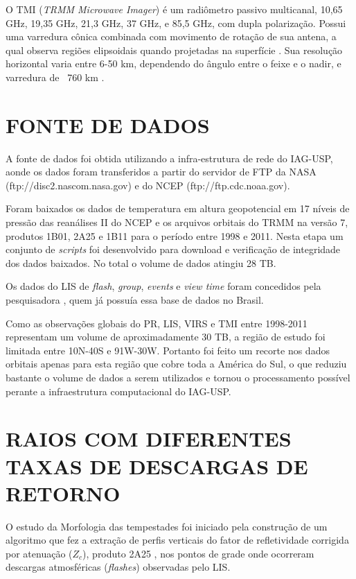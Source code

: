 O TMI (\textit{TRMM Microwave Imager}) é um radiômetro passivo multicanal, 10,65 GHz, 19,35 GHz, 21,3 GHz, 37 GHz, e 85,5 GHz, com dupla polarização. Possui uma varredura cônica combinada com movimento de rotação de sua antena, a qual observa regiões elipsoidais quando projetadas na superfície \cite{kummerok1998}. Sua resolução horizontal varia entre 6-50 km, dependendo do ângulo entre o feixe e o nadir, e varredura de ~760 km \cite{trmmhandbook}. 

\section{FONTE DE DADOS}

A fonte de dados foi obtida utilizando a infra-estrutura de rede do IAG-USP, aonde os dados foram transferidos a partir do servidor de FTP da NASA (ftp://disc2.nascom.nasa.gov) e do NCEP (ftp://ftp.cdc.noaa.gov).


Foram baixados os dados de temperatura em altura geopotencial em 17 níveis de pressão das reanálises II do NCEP e os arquivos orbitais do TRMM na versão 7, produtos 1B01, 2A25 e 1B11  para o período entre 1998 e 2011. Nesta etapa um conjunto de \textit{scripts} foi desenvolvido para download e verificação de integridade dos dados baixados. No total o volume de dados atingiu 28 TB.  %

Os dados do LIS de \textit{flash}, \textit{group}, \textit{events} e \textit{view time} foram concedidos pela pesquisadora , quem já possuía essa base de dados no Brasil. 

Como as observações globais do PR, LIS, VIRS e TMI entre 1998-2011 representam um volume de aproximadamente 30 TB, a região de estudo foi limitada entre 10N-40S e 91W-30W. Portanto foi feito um recorte nos dados orbitais apenas para esta região que cobre toda a América do Sul, o que reduziu bastante o volume de dados a serem utilizados e tornou o processamento possível perante a infraestrutura computacional do IAG-USP.

\section{RAIOS COM DIFERENTES TAXAS DE DESCARGAS DE RETORNO}

O estudo da Morfologia das tempestades foi iniciado pela construção de um algoritmo que fez a extração de perfis verticais do fator de refletividade corrigida por atenuação ($Z_c$),  produto 2A25 \cite{iguchi2009}, nos pontos de grade onde ocorreram descargas atmosféricas (\textit{flashes}) observadas pelo LIS.

